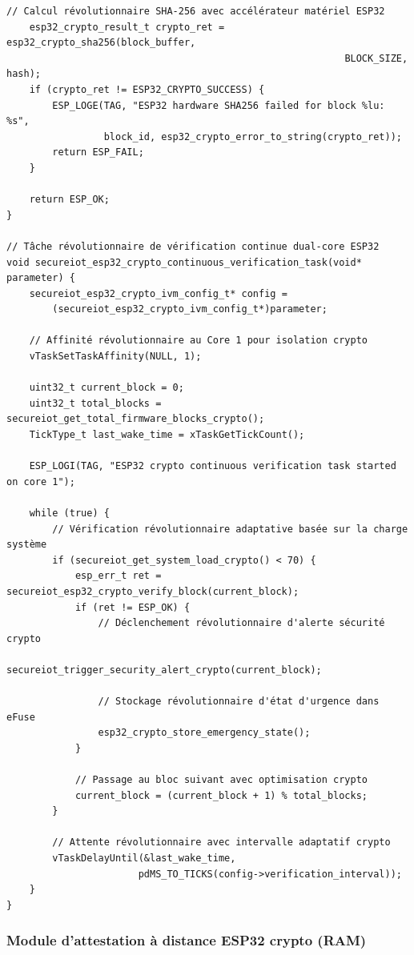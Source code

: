 \begin{lstlisting}[caption={Implémentation révolutionnaire IVM exploitant ESP32 crypto intégré}]
    // Calcul révolutionnaire SHA-256 avec accélérateur matériel ESP32
    esp32_crypto_result_t crypto_ret = esp32_crypto_sha256(block_buffer, 
                                                           BLOCK_SIZE, hash);
    if (crypto_ret != ESP32_CRYPTO_SUCCESS) {
        ESP_LOGE(TAG, "ESP32 hardware SHA256 failed for block %lu: %s", 
                 block_id, esp32_crypto_error_to_string(crypto_ret));
        return ESP_FAIL;
    }
    
    return ESP_OK;
}

// Tâche révolutionnaire de vérification continue dual-core ESP32
void secureiot_esp32_crypto_continuous_verification_task(void* parameter) {
    secureiot_esp32_crypto_ivm_config_t* config = 
        (secureiot_esp32_crypto_ivm_config_t*)parameter;
    
    // Affinité révolutionnaire au Core 1 pour isolation crypto
    vTaskSetTaskAffinity(NULL, 1);
    
    uint32_t current_block = 0;
    uint32_t total_blocks = secureiot_get_total_firmware_blocks_crypto();
    TickType_t last_wake_time = xTaskGetTickCount();
    
    ESP_LOGI(TAG, "ESP32 crypto continuous verification task started on core 1");
    
    while (true) {
        // Vérification révolutionnaire adaptative basée sur la charge système
        if (secureiot_get_system_load_crypto() < 70) {
            esp_err_t ret = secureiot_esp32_crypto_verify_block(current_block);
            if (ret != ESP_OK) {
                // Déclenchement révolutionnaire d'alerte sécurité crypto
                secureiot_trigger_security_alert_crypto(current_block);
                
                // Stockage révolutionnaire d'état d'urgence dans eFuse
                esp32_crypto_store_emergency_state();
            }
            
            // Passage au bloc suivant avec optimisation crypto
            current_block = (current_block + 1) % total_blocks;
        }
        
        // Attente révolutionnaire avec intervalle adaptatif crypto
        vTaskDelayUntil(&last_wake_time, 
                       pdMS_TO_TICKS(config->verification_interval));
    }
}
\end{lstlisting}

\subsubsection{Module d'attestation à distance ESP32 crypto (RAM)}

